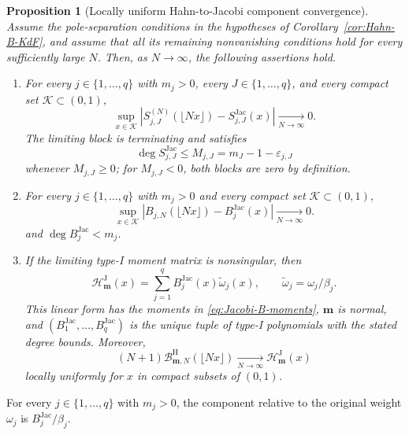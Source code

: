 \documentclass[10pt]{amsart}
\newcommand{\mm}{\boldsymbol m}
\theoremstyle{plain}
\newtheorem{proposition}[theorem]{Proposition}
\theoremstyle{definition}
\theoremstyle{remark}
\begin{document}
\begin{proposition}[Locally uniform Hahn-to-Jacobi component convergence]
\label{prop:Hahn-Jacobi-KdF-confluence}
Assume the pole-separation conditions in the hypotheses of
Corollary~\ref{cor:Hahn-B-KdF}, and assume that all its remaining
nonvanishing conditions hold for every sufficiently large \(N\). Then, as
\(N\to\infty\), the following assertions hold.
\begin{enumerate}[label=\textnormal{(\roman*)}]
\item For every \(j\in\{1,\ldots,q\}\) with \(m_j>0\), every
\(J\in\{1,\ldots,q\}\), and every compact set
\(\mathcal K\subset(0,1)\),
\begin{equation}
 \sup_{x\in\mathcal K}\left|
 S_{j,J}^{(N)}(\lfloor Nx\rfloor)-S_{j,J}^{\mathrm{Jac}}(x)
 \right|\xrightarrow[N\to\infty]{}0.
 \label{eq:Hahn-Jacobi-KdF-sector-limit}
\end{equation}
The limiting block is terminating and satisfies
\[
 \deg S_{j,J}^{\mathrm{Jac}}
 \le M_{j,J}=m_J-1-\varepsilon_{j,J}
\]
whenever \(M_{j,J}\ge0\); for \(M_{j,J}<0\), both blocks are zero by
definition.
\item For every \(j\in\{1,\ldots,q\}\) with \(m_j>0\) and every
compact set \(\mathcal K\subset(0,1)\),
\begin{equation}
 \sup_{x\in\mathcal K}\left|
 B_{j,N}(\lfloor Nx\rfloor)-B_j^{\mathrm{Jac}}(x)
 \right|\xrightarrow[N\to\infty]{}0.
 \label{eq:Hahn-Jacobi-KdF-component-limit}
\end{equation}
and \(\deg B_j^{\mathrm{Jac}}<m_j\).
\item If the limiting type-I moment matrix is nonsingular, then
\[
 \mathcal H_{\boldsymbol m}^{\mathrm J}(x)
 =\sum_{j=1}^qB_j^{\mathrm{Jac}}(x)\widetilde\omega_j(x),
 \qquad \widetilde\omega_j=\omega_j/\beta_j.
\]
This linear form has the moments in \eqref{eq:Jacobi-B-moments},
\(\boldsymbol m\) is normal, and
\((B_1^{\mathrm{Jac}},\ldots,B_q^{\mathrm{Jac}})\) is the unique tuple of
type-I polynomials with the stated degree bounds.
Moreover,
\begin{equation}
 (N+1)\mathcal B_{\mm,N}^{\mathrm H}(\lfloor Nx\rfloor)
 \xrightarrow[N\to\infty]{}\mathcal H_{\mm}^{\mathrm J}(x)
 \label{eq:Hahn-Jacobi-form-local-limit}
\end{equation}
locally uniformly for \(x\) in compact subsets of \((0,1)\).
\end{enumerate}
\end{proposition}

For every \(j\in\{1,\ldots,q\}\) with \(m_j>0\), the component relative
to the original weight \(\omega_j\) is \(B_j^{\mathrm{Jac}}/\beta_j\).
\end{document}
